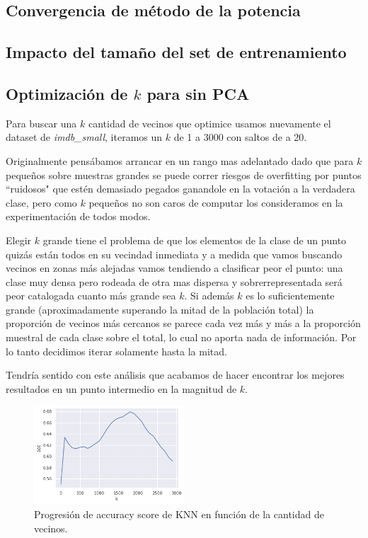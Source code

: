 \subsection{Convergencia de método de la potencia}%
\label{sub:pm}


\subsection{Impacto del tamaño del set de entrenamiento}%
\label{sub:exp_training_set}


\subsection{Optimización de $k$ para \knn{} sin PCA}%
\label{sub:knn_sin_pca}

Para buscar una $k$ cantidad de vecinos que optimice \knn{} usamos nuevamente el dataset de \textit{imdb\_small}, iteramos un $k$ de 1 a 3000 con saltos de a 20.

Originalmente pensábamos arrancar en un rango mas adelantado dado que para $k$ pequeños sobre muestras grandes se puede correr riesgos de overfitting por puntos ``ruidosos" que estén demasiado pegados ganandole en la votación a la verdadera clase, pero como $k$ pequeños no son caros de computar los consideramos en la experimentación de todos modos.

Elegir $k$ grande tiene el problema de que los elementos de la clase de un punto quizás están todos en su vecindad inmediata y a medida que vamos buscando vecinos en zonas más alejadas vamos tendiendo a clasificar peor el punto: una clase muy densa pero rodeada de otra mas dispersa y sobrerrepresentada será peor catalogada cuanto más grande sea $k$. Si además $k$ es lo suficientemente grande (aproximadamente superando la mitad de la población total) la proporción de vecinos más cercanos se parece cada vez más y más a la proporción muestral de cada clase sobre el total, lo cual no aporta nada de información. Por lo tanto decidimos iterar solamente hasta la mitad.

Tendría sentido con este análisis que acabamos de hacer encontrar los mejores resultados en un punto intermedio en la magnitud de $k$.

\begin{figure}[h]
\includegraphics[width=0.5\textwidth]{./img/knn.png}
\centering
\caption{Progresión de accuracy score de KNN en función de la cantidad de vecinos.\label{fig:knn_acc}}

\end{figure}

